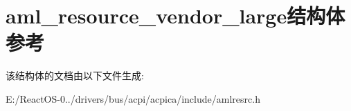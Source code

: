 \hypertarget{structaml__resource__vendor__large}{}\section{aml\+\_\+resource\+\_\+vendor\+\_\+large结构体 参考}
\label{structaml__resource__vendor__large}


该结构体的文档由以下文件生成\+:\begin{DoxyCompactItemize}
\item 
E\+:/\+React\+O\+S-\/0../drivers/bus/acpi/acpica/include/amlresrc.\+h\end{DoxyCompactItemize}
